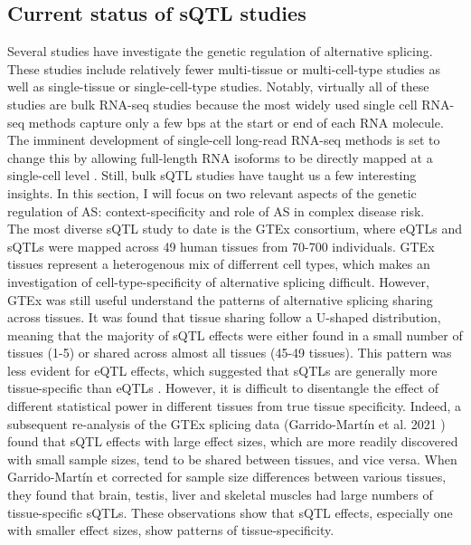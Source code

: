 \subsection{Current status of sQTL studies}
Several studies have investigate the genetic regulation of alternative splicing. These studies include relatively fewer multi-tissue or multi-cell-type studies as well as single-tissue or single-cell-type studies. Notably, virtually all of these studies are bulk RNA-seq studies because the most widely used single cell RNA-seq methods capture only a few bps at the start or end of each RNA molecule. The imminent development of single-cell long-read RNA-seq methods is set to change this by allowing full-length RNA isoforms to be directly mapped at a single-cell level \cite{Dong2023-xs}. Still, bulk sQTL studies have taught us a few interesting insights. In this section, I will focus on two relevant aspects of the genetic regulation of AS: context-specificity and role of AS in complex disease risk.\\

The most diverse sQTL study to date is the GTEx consortium, where eQTLs and sQTLs were mapped across 49 human tissues from 70-700 individuals. GTEx tissues represent a heterogenous mix of differrent cell types, which makes an investigation of cell-type-specificity of alternative splicing difficult. However, GTEx was still useful understand the patterns of alternative splicing sharing across tissues. It was found that tissue sharing follow a U-shaped distribution, meaning that the majority of sQTL effects were either found in a small number of tissues (1-5) or shared across almost all tissues (45-49 tissues). This pattern was less evident for eQTL effects, which suggested that sQTLs are generally more tissue-specific than eQTLs \cite{The_GTEx_Consortium2020-gg}. However, it is difficult to disentangle the effect of different statistical power in different tissues from true tissue specificity. Indeed, a subsequent re-analysis of the GTEx splicing data (Garrido-Martín et al. 2021 \cite{Garrido-Martin2021-sk}) found that sQTL effects with large effect sizes, which are more readily discovered with small sample sizes, tend to be shared between tissues, and vice versa. When Garrido-Martín et corrected for sample size differences between various tissues, they found that brain, testis, liver and skeletal muscles had large numbers of tissue-specific sQTLs. These observations show that sQTL effects, especially one with smaller effect sizes, show patterns of tissue-specificity. \\

